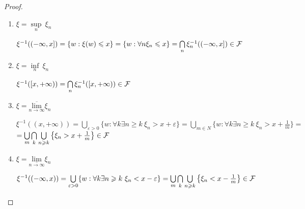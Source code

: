 \begin{proof}
\:\newline
\begin{enumerate}
    \item $\xi = \sup\limits_{n} \ \xi_n$
    
    $\xi^{-1}((-\infty, x]) = \{w: \xi(w) \leqslant x\} = \{w : \forall n \xi_n \leqslant x\} = \bigcap\limits_{n} \xi_n^{-1}((-\infty, x]) \in \mathcal{F}$
    
    \item $\xi = \inf\limits_{n} \ \xi_n$
    
    $\xi^{-1}([x, +\infty)) = \bigcap\limits_{n} \xi_n^{-1}([x, +\infty)) \in \mathcal{F}$
    
    \item $\xi = \underset{n \to \infty}{\overline{\text{lim}}} \xi_n$
    
    $\xi^{-1}((x, +\infty)) = \bigcup\limits_{\varepsilon > 0} \{w\!\!\! : \forall k \exists n \geqslant k \ \xi_n > x + \varepsilon\} = \bigcup\limits_{m \in N} \{w\!\!\! : \forall k \exists n \geqslant k \ \xi_n > x + \frac{1}{m}\} =$
    $= \bigcup\limits_{m}\bigcap\limits_{k}\bigcup\limits_{n \geqslant k} \left\{\xi_n > x + \frac{1}{m}\right\} \in \mathcal{F}$
    
    \item $\xi = \underset{n \to \infty}{\underline{\text{lim}}} \xi_n$
    
    $\xi^{-1}((-\infty, x)) = \bigcup\limits_{\varepsilon > 0} \{w : \forall k \exists n \geqslant k \ \xi_n < x - \varepsilon\} = \bigcup\limits_{m}\bigcap\limits_{k}\bigcup\limits_{n \geqslant k}\left\{\xi_n < x - \frac{1}{m}\right\} \in \mathcal{F}$
\end{enumerate}
\end{proof}